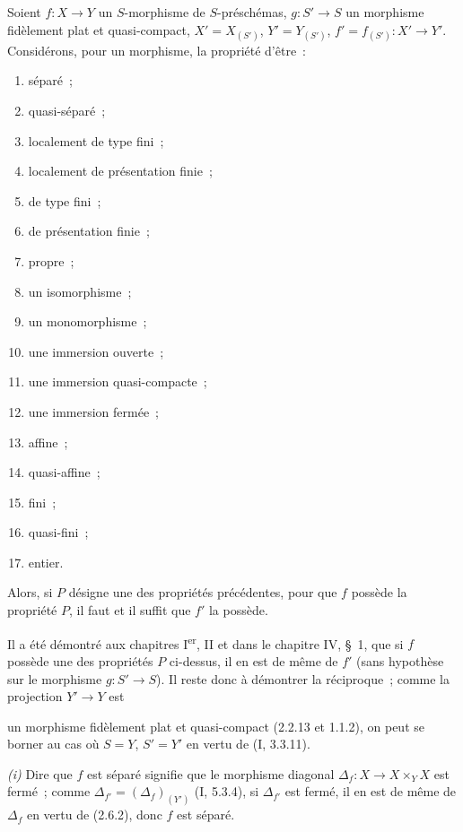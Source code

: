 \begin{proposition}[2.7.1]
\label{IV.2.7.1-fr}
Soient $f:X\to Y$ un $S$-morphisme de $S$-préschémas, $g:S'\to S$ un
morphisme fidèlement plat et quasi-compact, $X'=X_{(S')}$, $Y'=Y_{(S')}$,
$f'=f_{(S')}:X'\to Y'$. Considérons, pour un morphisme, la propriété d'être~:
\begin{enumerate}
\item[(i)] séparé~;
\item[(ii)] quasi-séparé~;
\item[(iii)] localement de type fini~;
\item[(iv)] localement de présentation finie~;
\item[(v)] de type fini~;
\item[(vi)] de présentation finie~;
\item[(vii)] propre~;
\item[(viii)] un isomorphisme~;
\item[(ix)] un monomorphisme~;
\item[(x)] une immersion ouverte~;
\item[(xi)] une immersion quasi-compacte~;
\item[(xii)] une immersion fermée~;
\item[(xiii)] affine~;
\item[(xiv)] quasi-affine~;
\item[(xv)] fini~;
\item[(xvi)] quasi-fini~;
\item[(xvii)] entier.
\end{enumerate}
Alors, si $P$ désigne une des propriétés précédentes, pour que $f$ possède la
propriété $P$, il faut et il suffit que $f'$ la possède.
\end{proposition}

Il a été démontré aux chapitres I\textsuperscript{er}, II et dans le chapitre
IV, \S~1, que si $f$ possède une des propriétés $P$ ci-dessus, il en est de
même de $f'$ (sans hypothèse sur le morphisme $g:S'\to S$). Il reste donc à
démontrer la réciproque~; comme la projection $Y'\to Y$ est

un morphisme fidèlement plat et quasi-compact (2.2.13 et 1.1.2), on peut se
borner au cas où $S=Y$, $S'=Y'$ en vertu de (I, 3.3.11).

\emph{(i)} Dire que $f$ est séparé signifie que le morphisme diagonal
$\Delta_f:X\to X\times_Y X$ est fermé~; comme
$\Delta_{f'}=(\Delta_f)_{(Y')}$ (I, 5.3.4), si $\Delta_{f'}$ est fermé, il
en est de même de $\Delta_f$ en vertu de (2.6.2), donc $f$ est séparé.

